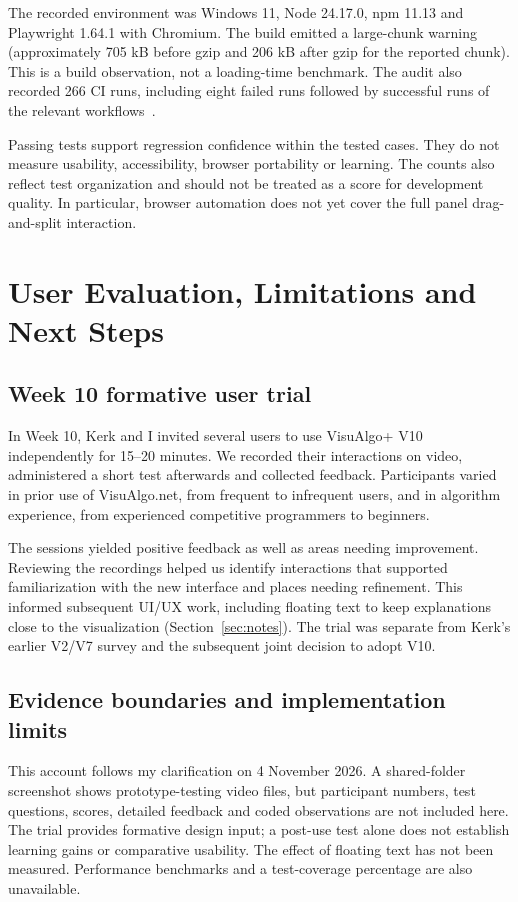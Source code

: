 \documentclass[11pt,a4paper]{article}
\newcommand{\page}{\par\penalty0 \ifdim\pagetotal>.72\textheight\clearpage\else\vspace{8pt}\fi}
\begin{document}
The recorded environment was Windows 11, Node 24.17.0, npm 11.13 and Playwright 1.64.1 with Chromium. The build emitted a large-chunk warning (approximately 705 kB before gzip and 206 kB after gzip for the reported chunk). This is a build observation, not a loading-time benchmark. The audit also recorded 266 CI runs, including eight failed runs followed by successful runs of the relevant workflows~\cite{validation}.

Passing tests support regression confidence within the tested cases. They do not measure usability, accessibility, browser portability or learning. The counts also reflect test organization and should not be treated as a score for development quality. In particular, browser automation does not yet cover the full panel drag-and-split interaction.

\page
\section{User Evaluation, Limitations and Next Steps}
\subsection{Week 10 formative user trial}
In Week 10, Kerk and I invited several users to use VisuAlgo+ V10 independently for 15--20 minutes. We recorded their interactions on video, administered a short test afterwards and collected feedback. Participants varied in prior use of VisuAlgo.net, from frequent to infrequent users, and in algorithm experience, from experienced competitive programmers to beginners.

The sessions yielded positive feedback as well as areas needing improvement. Reviewing the recordings helped us identify interactions that supported familiarization with the new interface and places needing refinement. This informed subsequent UI/UX work, including floating text to keep explanations close to the visualization (Section~\ref{sec:notes}). The trial was separate from Kerk's earlier V2/V7 survey and the subsequent joint decision to adopt V10.

\subsection{Evidence boundaries and implementation limits}
This account follows my clarification on 4 November 2026. A shared-folder screenshot shows prototype-testing video files, but participant numbers, test questions, scores, detailed feedback and coded observations are not included here. The trial provides formative design input; a post-use test alone does not establish learning gains or comparative usability. The effect of floating text has not been measured. Performance benchmarks and a test-coverage percentage are also unavailable.
\end{document}
